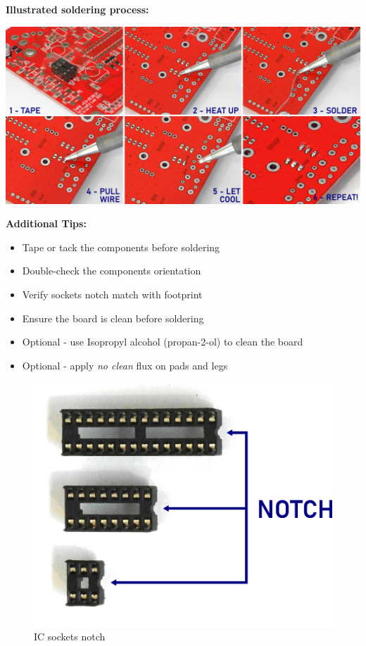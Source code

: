 \documentclass{scrartcl}
\begin{document}
\pagebreak
\textbf{Illustrated soldering process:}

\begin{center}
    \includegraphics[scale=0.65]{assets/solder-strip.jpg}
\end{center}

\vspace{0.50cm}
\textbf{Additional Tips:}

\begin{itemize}
    \item Tape or tack the components before soldering
    \item Double-check the components orientation
    \item Verify sockets notch match with footprint
    \item Ensure the board is clean before soldering
    \item Optional - use Isopropyl alcohol (propan-2-ol) to clean the board
    \item Optional - apply \emph{no clean} flux on pads and legs
\end{itemize}

\vspace{0.25cm}

\begin{figure}[!ht]
    \begin{center}
        \includegraphics[scale=0.38]{assets/ic-notch.png}
        \caption{IC sockets notch}
    \end{center}
\end{figure}
\end{document}

